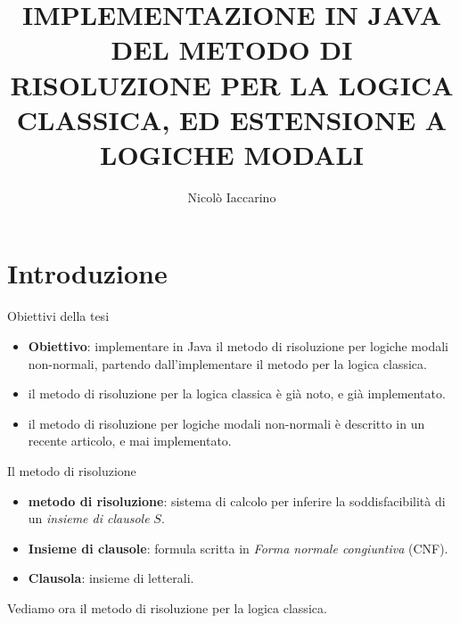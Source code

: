 \documentclass{beamer}
\title{IMPLEMENTAZIONE IN JAVA DEL METODO DI RISOLUZIONE PER LA LOGICA CLASSICA, ED ESTENSIONE A LOGICHE MODALI}
\author{Nicolò Iaccarino}
\begin{document}
\maketitle



\section{Introduzione}

\begin{frame}{Obiettivi della tesi}
    \begin{itemize}
        \item \textbf{Obiettivo}: implementare in Java il metodo di risoluzione per logiche modali non-normali, partendo dall'implementare il metodo per la logica classica.
        \vspace{10px}
        \item il metodo di risoluzione per la logica classica è già noto, e già implementato.
        \vspace{10px}
        \item il metodo di risoluzione per logiche modali non-normali è descritto in un recente articolo, e mai implementato.
        \vspace{10px}
    \end{itemize}
    
    
\end{frame}

\begin{frame}{Il metodo di risoluzione}
    \begin{itemize}
        \item \textbf{metodo di risoluzione}: sistema di calcolo per inferire la soddisfacibilità di un \emph{insieme di clausole} $S$.
        \vspace{10px}
        \item \textbf{Insieme di clausole}: formula scritta in \emph{Forma normale congiuntiva} (CNF).
        \vspace{10px}
        \item \textbf{Clausola}: insieme di letterali.
    \end{itemize}
    \vspace{20px}

    Vediamo ora il metodo di risoluzione per la logica classica.
\end{frame}
\end{document}
